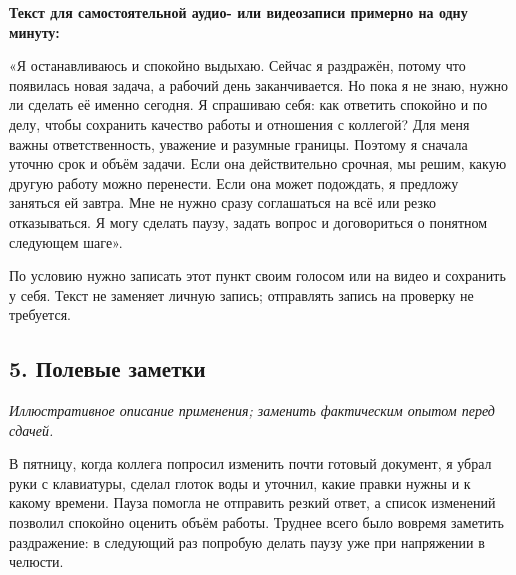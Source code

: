 \documentclass[10pt,a4paper]{article}
\begin{document}
\textbf{Текст для самостоятельной аудио- или видеозаписи примерно на одну минуту:}

«Я останавливаюсь и спокойно выдыхаю. Сейчас я раздражён, потому что появилась новая задача, а рабочий день заканчивается. Но пока я не знаю, нужно ли сделать её именно сегодня. Я спрашиваю себя: как ответить спокойно и по делу, чтобы сохранить качество работы и отношения с коллегой? Для меня важны ответственность, уважение и разумные границы. Поэтому я сначала уточню срок и объём задачи. Если она действительно срочная, мы решим, какую другую работу можно перенести. Если она может подождать, я предложу заняться ей завтра. Мне не нужно сразу соглашаться на всё или резко отказываться. Я могу сделать паузу, задать вопрос и договориться о понятном следующем шаге».

По условию нужно записать этот пункт своим голосом или на видео и сохранить у себя. Текст не заменяет личную запись; отправлять запись на проверку не требуется.

\subsection*{5. Полевые заметки}

\textit{Иллюстративное описание применения; заменить фактическим опытом перед сдачей.}

В пятницу, когда коллега попросил изменить почти готовый документ, я убрал руки с клавиатуры, сделал глоток воды и уточнил, какие правки нужны и к какому времени. Пауза помогла не отправить резкий ответ, а список изменений позволил спокойно оценить объём работы. Труднее всего было вовремя заметить раздражение: в следующий раз попробую делать паузу уже при напряжении в челюсти.
\end{document}
